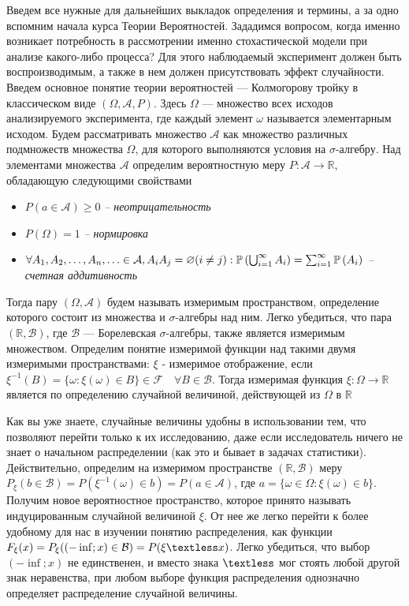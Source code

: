 \documentclass{article}
\begin{document}
        Введем все нужные для дальнейших выкладок определения и термины, а за одно вспомним начала курса Теории Вероятностей. Зададимся вопросом, когда именно возникает потребность в рассмотрении именно стохастической модели при анализе какого-либо процесса? Для этого наблюдаемый эксперимент должен быть воспроизводимым, а также в нем должен присутствовать эффект случайности. Введем основное понятие теории вероятностей — Колмогорову тройку в классическом виде $(\Omega, \mathcal{A}, P)$. Здесь $\Omega$ — множество всех исходов анализируемого эксперимента, где каждый элемент $\omega$ называется элементарным исходом. Будем рассматривать множество $\mathcal{A}$ как множество различных подмножеств множества $\Omega$, для которого выполняются условия на $\sigma$-алгебру. Над элементами множества $\mathcal{A}$ определим вероятностную меру $P: \mathcal{A} \longrightarrow \mathds{R}$, обладающую следующими свойствами
        \begin{itemize}
            \item $P(a \in \mathcal{A}) \geqslant 0$ \textit{-- неотрицательность}
            \item $P(\Omega) = 1$ \textit{-- нормировка}
            \item $\forall A_1, A_2, \ldots, A_n, \ldots \in \mathcal{A}, \\  A_i A_j=\varnothing(i \neq j): \mathbb{P}\left(\bigcup_{i=1}^{\infty} A_i\right)=\sum_{i=1}^{\infty} \mathbb{P}\left(A_i\right)$ \textit{-- счетная аддитивность}
        \end{itemize}
        
        Тогда пару $(\Omega, \mathcal{A})$ будем называть измеримым пространством, определение которого состоит из множества и $\sigma$-алгебры над ним. Легко убедиться, что пара $(\mathds{R}, \mathcal{B})$, где $\mathcal{B}$ — Борелевская $\sigma$-алгебры, также является измеримым множеством. Определим понятие измеримой функции над такими двумя измеримыми пространствами: $\xi$ - измеримое отображение, если $\xi^{-1}(B)=\{\omega: \xi(\omega) \in B\} \in \mathcal{F} \quad \forall B \in \mathcal{B}$. Тогда измеримая функция $\xi: \Omega \longrightarrow \mathds{R}$ является по определению случайной величиной, действующей из $\Omega$ в $\mathds{R}$

        Как вы уже знаете, случайные величины удобны в использовании тем, что позволяют перейти только к их исследованию, даже если исследователь ничего не знает о начальном распределении (как это и бывает в задачах статистики). Действительно, определим на измеримом пространстве $(\mathds{R}, \mathcal{B})$ меру $P_{\xi}(b \in \mathcal{B}) = P({\xi^{-1}(\omega) \in b})=P(a \in \mathcal{A})$, где $a = \{\omega \in \Omega: \xi(\omega) \in b\}$. Получим новое вероятностное пространство, которое принято называть индуцированным случайной величиной $\xi$. 
        От нее же легко перейти к более удобному для нас в изучении понятию распределения, как функции $F_{\xi}(x)=P_{\xi}((-\inf; x) \in \mathcal{B}) = P(\xi \textless x)$. Легко убедиться, что выбор $(-\inf; x)$ не единственен, и вместо знака $\textless$ мог стоять любой другой знак неравенства, при любом выборе функция распределения однозначно определяет распределение случайной величины.
\end{document}
